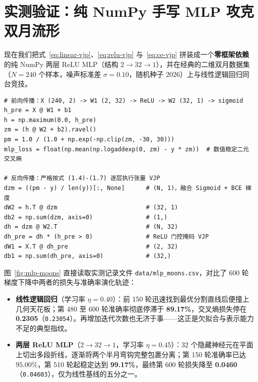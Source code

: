 \section{实测验证：纯 NumPy 手写 MLP 攻克双月流形}
\label{sec:exp-moons}

现在我们把式~\eqref{eq:linear-vjp}、\eqref{eq:relu-vjp} 与~\eqref{eq:ce-vjp} 拼装成一个\textbf{零框架依赖}的纯 NumPy 两层 ReLU MLP（结构 $2 \to 32 \to 1$），并在经典的二维双月数据集（$N = 240$ 个样本，噪声标准差 $\sigma = 0.10$，随机种子 $2026$）上与线性逻辑回归同台竞技。

\begin{lstlisting}[caption={纯 NumPy 2 层 ReLU MLP 的前向与手动 VJP 反向传播（摘自 \texttt{vol5\_experiments.py}）}]
# 前向传播：X (240, 2) -> W1 (2, 32) -> ReLU -> W2 (32, 1) -> sigmoid
h_pre = X @ W1 + b1
h = np.maximum(0.0, h_pre)
zm = (h @ W2 + b2).ravel()
pm = 1.0 / (1.0 + np.exp(-np.clip(zm, -30, 30)))
mlp_loss = float(np.mean(np.logaddexp(0, zm) - y * zm))  # 数值稳定二元交叉熵

# 反向传播：严格按式 (1.4)-(1.7) 逐层执行张量 VJP
dzm = ((pm - y) / len(y))[:, None]      # (N, 1)，融合 Sigmoid + BCE 梯度
dW2 = h.T @ dzm                         # (32, 1)
db2 = np.sum(dzm, axis=0)               # (1,)
dh = dzm @ W2.T                         # (N, 32)
dh_pre = dh * (h_pre > 0)               # ReLU 门控掩码 VJP
dW1 = X.T @ dh_pre                      # (2, 32)
db1 = np.sum(dh_pre, axis=0)            # (32,)
\end{lstlisting}

图~\ref{fig:mlp-moons} 直接读取实测记录文件 \texttt{data/mlp\_moons.csv}，对比了 600 轮梯度下降中两者的损失与准确率演化轨迹：
\begin{itemize}
  \item \textbf{线性逻辑回归}（学习率 $\eta = 0.40$）：前 150 轮迅速找到最优分割直线后便撞上几何天花板；第 480 至 600 轮准确率彻底停滞于 \textbf{89.17\%}，交叉熵损失停在 \textbf{0.2305}（\texttt{0.23054}）。再增加迭代次数也无济于事——这正是欠拟合与表示能力不足的典型指纹。
  \item \textbf{两层 ReLU MLP}（$2 \to 32 \to 1$，学习率 $\eta = 0.45$）：32 个隐藏神经元在平面上切出多段折线，逐渐将两个半月弯钩完整包裹分离；第 150 轮准确率已达 $95.00\%$，第 510 轮起稳定达到 \textbf{99.17\%}，最终第 600 轮损失降至 \textbf{0.0460}（\texttt{0.04603}），仅为线性基线的五分之一。
\end{itemize}

